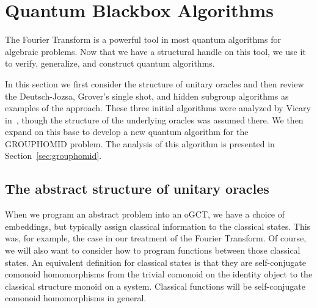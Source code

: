 \section{Quantum Blackbox Algorithms}
\label{sec:blackbox}
The Fourier Transform is a powerful tool in most quantum algorithms for algebraic problems. Now that we have a structural handle on this tool, we use it to verify, generalize, and construct quantum algorithms.

In this section we first consider the structure of unitary oracles and then review the Deutsch-Jozsa, Grover's single shot, and hidden subgroup algorithms as examples of the approach.  These three initial algorithms were analyzed by Vicary in~\cite{vicary-tqa}, though the structure of the underlying oracles was assumed there.  We then expand on this base to develop a new quantum algorithm for the GROUPHOMID problem. The analysis of this algorithm is presented in Section~\ref{sec:grouphomid}.

\subsection{The abstract structure of unitary oracles}
\label{sec:unitaryoracles}

When we program an abstract problem into an oGCT, we have a choice of embeddings, but typically assign classical information to the classical states. This was, for example, the case in our treatment of the Fourier Transform. Of course, we will also want to consider how to program functions between those classical states. An equivalent definition for classical states is that they are self-conjugate comonoid homomorphisms from the trivial comonoid on the identity object to the classical structure monoid on a system. Classical functions will be self-conjugate comonoid homomorphisms in general.

